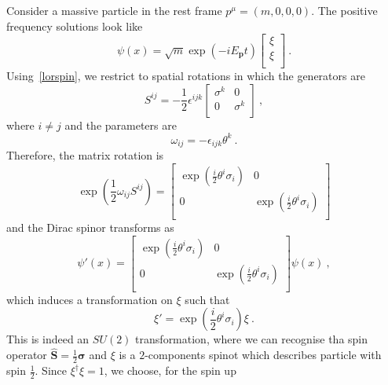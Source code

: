     Consider a massive particle in the rest frame $p^\mu = (m, 0, 0,0)$. The positive frequency solutions look like 
    \begin{equation*}
        \psi(x) = \sqrt{m} \exp(- i E_{\mathbf p} t) \begin{bmatrix}
            \xi \\ \xi \\
        \end{bmatrix} ~.
    \end{equation*}
    Using~\eqref{lorspin}, we restrict to spatial rotations in which the generators are
    \begin{equation*}
        S^{ij} = - \frac{1}{2} \epsilon^{ijk} \begin{bmatrix}
            \sigma^k & 0 \\ 0 & \sigma^k \\
        \end{bmatrix} ~,
    \end{equation*}
    where $i \neq j$ and the parameters are 
    \begin{equation*}
        \omega_{ij} = - \epsilon_{ijk} \theta^k ~.
    \end{equation*}
    Therefore, the matrix rotation is 
    \begin{equation*}
        \exp(\frac{1}{2} \omega_{ij} S^{ij}) = \begin{bmatrix}
            \exp(\frac{i}{2} \theta^i \sigma_i) & 0 \\ 0 & \exp(\frac{i}{2} \theta^i \sigma_i) \\
        \end{bmatrix}
    \end{equation*}
    and the Dirac spinor transforms as 
    \begin{equation*}
        \psi' (x) = \begin{bmatrix}
            \exp(\frac{i}{2} \theta^i \sigma_i) & 0 \\ 0 & \exp(\frac{i}{2} \theta^i \sigma_i) \\
        \end{bmatrix} \psi (x) ~,
    \end{equation*}
    which induces a transformation on $\xi$ such that 
    \begin{equation*}
        \xi ' = \exp(\frac{i}{2} \theta^i \sigma_i) \xi ~.
    \end{equation*}
    This is indeed an $SU(2)$ transformation, where we can recognise tha spin operator $\hat{\mathbf S} = \frac{1}{2} \boldsymbol \sigma$ and $\xi$ is a $2$-components spinot which describes particle with spin $\frac{1}{2}$. Since $\xi^\dagger \xi = 1$, we choose, for the spin up
